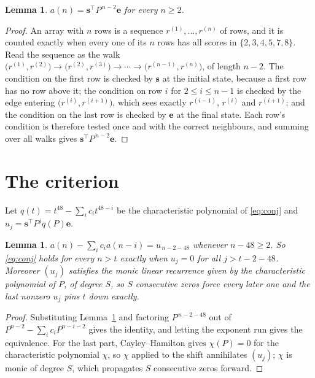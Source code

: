 \documentclass[11pt,a4paper]{article}
\theoremstyle{plain}
\newtheorem{lemma}[theorem]{Lemma}
\theoremstyle{definition}
\begin{document}
\begin{lemma}\label{lem:walk}
$a(n)=\mathbf{s}^{\!\top}P^{\,n-2}\mathbf{e}$ for every $n\ge2$.
\end{lemma}

\begin{proof}
An array with $n$ rows is a sequence $r^{(1)},\dots,r^{(n)}$ of rows, and it is counted
exactly when every one of its $n$ rows has all scores in $\{2,3,4,5,7,8\}$. Read the sequence as the
walk $\bigl(r^{(1)},r^{(2)}\bigr)\to\bigl(r^{(2)},r^{(3)}\bigr)\to\cdots\to
\bigl(r^{(n-1)},r^{(n)}\bigr)$, of length $n-2$. The condition on the first row is
checked by $\mathbf{s}$ at the initial state, because a first row has no row above it; the
condition on row $i$ for $2\le i\le n-1$ is checked by the edge entering
$\bigl(r^{(i)},r^{(i+1)}\bigr)$, which sees exactly $r^{(i-1)}$, $r^{(i)}$ and
$r^{(i+1)}$; and the condition on the last row is checked by $\mathbf{e}$ at the final
state. Each row's condition is therefore tested once and with the correct neighbours, and
summing over all walks gives $\mathbf{s}^{\!\top}P^{\,n-2}\mathbf{e}$.
\end{proof}

\section{The criterion}

Let $q(t)=t^{48}-\sum_i c_i t^{48-i}$ be the characteristic polynomial of
\eqref{eq:conj} and $u_j=\mathbf{s}^{\!\top}P^{j}q(P)\mathbf{e}$.

\begin{lemma}\label{lem:crit}
$a(n)-\sum_i c_i a(n-i)=u_{\,n-2-48}$ whenever $n-48\ge2$. So \eqref{eq:conj}
holds for every $n>t$ exactly when $u_j=0$ for all $j>t-2-48$. Moreover $(u_j)$
satisfies the monic linear recurrence given by the characteristic polynomial of $P$, of
degree $S$, so $S$ consecutive zeros force every later one and the last nonzero $u_j$ pins
$t$ down exactly.
\end{lemma}

\begin{proof}
Substituting Lemma~\ref{lem:walk} and factoring $P^{\,n-2-48}$ out of
$P^{n-2}-\sum_i c_i P^{n-i-2}$ gives the identity, and letting the exponent run gives the
equivalence. For the last part, Cayley--Hamilton gives $\chi(P)=0$ for the characteristic
polynomial $\chi$, so $\chi$ applied to the shift annihilates $(u_j)$; $\chi$ is monic of
degree $S$, which propagates $S$ consecutive zeros forward.
\end{proof}
\end{document}
